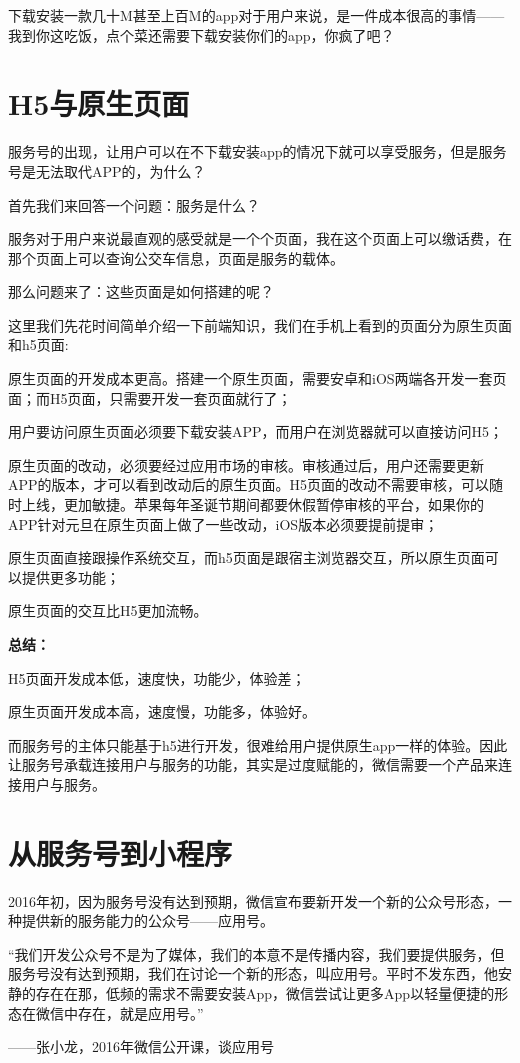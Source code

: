 \documentclass[12pt]{article}
\begin{document}
下载安装一款几十M甚至上百M的app对于用户来说，是一件成本很高的事情——我到你这吃饭，点个菜还需要下载安装你们的app，你疯了吧？

\section{H5与原生页面}
服务号的出现，让用户可以在不下载安装app的情况下就可以享受服务，但是服务号是无法取代APP的，为什么？

首先我们来回答一个问题：服务是什么？

服务对于用户来说最直观的感受就是一个个页面，我在这个页面上可以缴话费，在那个页面上可以查询公交车信息，页面是服务的载体。

那么问题来了：这些页面是如何搭建的呢？

这里我们先花时间简单介绍一下前端知识，我们在手机上看到的页面分为原生页面和h5页面:

\begin{framed}
原生页面的开发成本更高。搭建一个原生页面，需要安卓和iOS两端各开发一套页面；而H5页面，只需要开发一套页面就行了；

用户要访问原生页面必须要下载安装APP，而用户在浏览器就可以直接访问H5；

原生页面的改动，必须要经过应用市场的审核。审核通过后，用户还需要更新APP的版本，才可以看到改动后的原生页面。H5页面的改动不需要审核，可以随时上线，更加敏捷。苹果每年圣诞节期间都要休假暂停审核的平台，如果你的APP针对元旦在原生页面上做了一些改动，iOS版本必须要提前提审；

原生页面直接跟操作系统交互，而h5页面是跟宿主浏览器交互，所以原生页面可以提供更多功能；

原生页面的交互比H5更加流畅。

\textbf{总结：}

H5页面开发成本低，速度快，功能少，体验差；

原生页面开发成本高，速度慢，功能多，体验好。
\end{framed}

而服务号的主体只能基于h5进行开发，很难给用户提供原生app一样的体验。因此让服务号承载连接用户与服务的功能，其实是过度赋能的，微信需要一个产品来连接用户与服务。

\section{从服务号到小程序}
2016年初，因为服务号没有达到预期，微信宣布要新开发一个新的公众号形态，一种提供新的服务能力的公众号——应用号。

\begin{framed}
“我们开发公众号不是为了媒体，我们的本意不是传播内容，我们要提供服务，但服务号没有达到预期，我们在讨论一个新的形态，叫应用号。平时不发东西，他安静的存在在那，低频的需求不需要安装App，微信尝试让更多App以轻量便捷的形态在微信中存在，就是应用号。”

——张小龙，2016年微信公开课，谈应用号
\end{framed}
\end{document}
